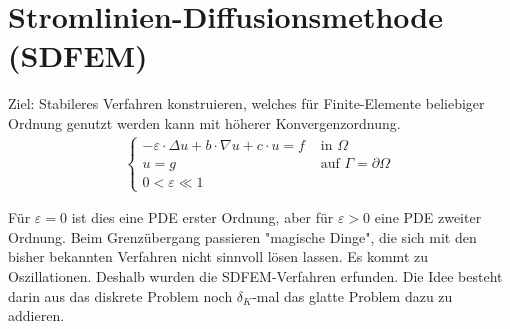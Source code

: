 \documentclass[12pt]{scrartcl}
\begin{document}
	
	\section{Stromlinien-Diffusionsmethode (SDFEM)}
	
	Ziel: Stabileres Verfahren konstruieren, welches für Finite-Elemente beliebiger Ordnung genutzt werden kann mit höherer Konvergenzordnung.
	\begin{align*}
\left\lbrace
	\begin{array}{rl}
	-\varepsilon\cdot\Delta u+b\cdot \nabla u+c\cdot u=f&\text{ in }\Omega\\
	u=g&\text{ auf }\Gamma=\partial\Omega\\
	0<\varepsilon\ll 1&
	\end{array}
	\right.
\end{align*}

	Für $\varepsilon=0$ ist dies eine PDE erster Ordnung, aber für $\varepsilon>0$ eine PDE zweiter Ordnung.
	Beim Grenzübergang passieren "magische Dinge", die sich mit den bisher bekannten Verfahren nicht sinnvoll lösen lassen.
	Es kommt zu Oszillationen.
	Deshalb wurden die SDFEM-Verfahren erfunden.
	Die Idee besteht darin aus das diskrete Problem noch $\delta_K$-mal das glatte Problem dazu zu addieren.
	
\end{document}
